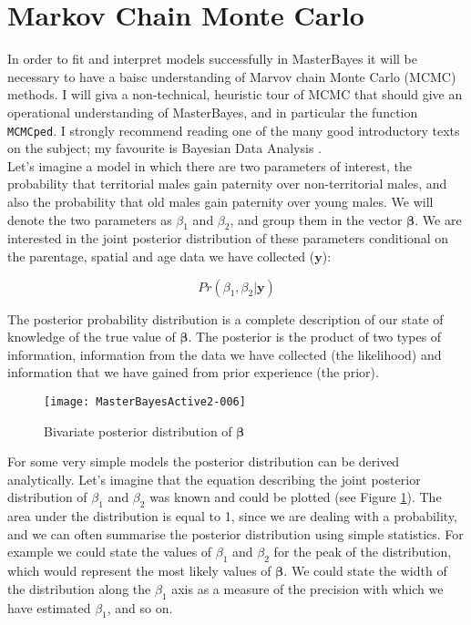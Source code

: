 \documentclass{article}
\begin{document}
\section{\large{Markov Chain Monte Carlo}}
\label{MCMC-sec}

In order to fit and interpret models successfully in MasterBayes it will be necessary to have a baisc understanding of Marvov chain Monte Carlo (MCMC) methods.  I will giva a non-technical, heuristic tour of MCMC that should give an operational understanding of MasterBayes, and in particular the function \texttt{MCMCped}. I strongly recommend reading one of the many good introductory texts on the subject; my favourite is Bayesian Data Analysis \citep{Gelman.2004}.\\  

Let's imagine a model in which there are two parameters of interest, the probability that territorial males gain paternity over non-territorial males, and also the probability that old males gain paternity over young males.  We will denote the two parameters as $\beta_{1}$ and  $\beta_{2}$, and group them in the vector $\bm{\beta}$.   We are interested in the joint posterior distribution of these parameters conditional on the parentage, spatial and age data we have collected ($\bm{y}$):

\begin{equation}
Pr(\beta_{1}, \beta_{2} | \bm{y})
\end{equation}

The posterior probability distribution is a complete description of our state of knowledge of the true value of $\bm{\beta}$. The posterior is the product of two types of information, information from the data we have collected (the likelihood) and information that we have gained from prior experience (the prior).\\  



\begin{figure}[!h]
\begin{center}
\texttt{[image: MasterBayesActive2-006]}
\end{center}
\caption{Bivariate posterior distribution of $\bm{\beta}$}
\label{densityP}
\end{figure}

For some very simple models the posterior distribution can be derived analytically. Let's imagine that the equation describing the joint posterior distribution of $\beta_{1}$ and $\beta_{2}$ was known and could be plotted (see Figure \ref{densityP}).  The area under the distribution is equal to 1, since we are dealing with a probability, and we can often summarise the posterior distribution using simple statistics.  For example we could state the values of $\beta_{1}$ and $\beta_{2}$ for the peak of the distribution, which would represent the most likely values of $\bm{\beta}$.  We could state the width of the distribution along the $\beta_{1}$ axis as a measure of the precision with which we have estimated $\beta_{1}$, and so on.\\
\end{document}
